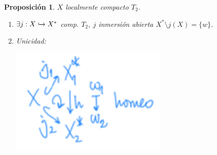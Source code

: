 \documentclass[10pt,a4paper,openright]{book}
\theoremstyle{break}
\newtheorem*{prop}{Proposición}
\begin{document}
\begin{prop}
$X$ localmente compacto $T_2$.
\begin{enumerate}
    \item $\exists j : X \xhookrightarrow{} X^*$ comp. $T_2,\ j$ inmersión abierta $X^* \setminus j\left( X \right) = \{w\}$.
    \item Unicidad: 
    \begin{center}
        \includegraphics[scale=0.3]{images/comp_pto_prop_1} 
    \end{center}
\end{enumerate}
\end{prop}
\end{document}
